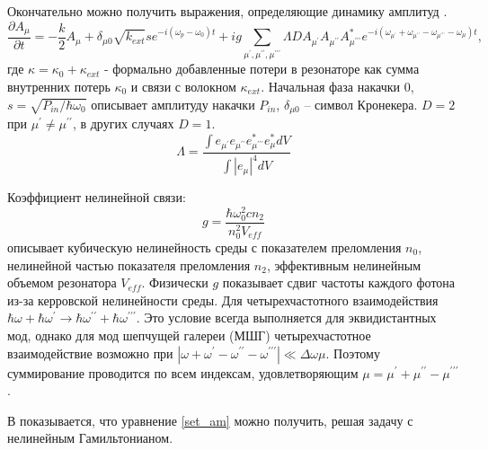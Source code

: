 Окончательно можно получить выражения, определяющие динамику амплитуд \cite{Herr2012}\cite{Chembo2010pra}.
\begin{equation}\label{set_am}
\frac{\partial A_\mu}{\partial t}=-\frac{k}{2}A_\mu+\delta_{\mu 0}\sqrt{k_{ext}}se^{-i(\omega_p-\omega_0)t}+ig\sum_{\mu^\prime,\mu^{\prime\prime},\mu^{\prime\prime\prime}} \Lambda D A_{\mu^\prime}A_{\mu^{\prime\prime}}A_{\mu^{\prime\prime\prime}}^*e^{-i(\omega_{\mu^\prime}+\omega_{\mu^{\prime\prime}}-\omega_{\mu^{\prime\prime\prime}}-\omega_\mu)t},
\end{equation}
где $\kappa=\kappa_0+\kappa_{ext}$ - формально добавленные потери в резонаторе как сумма внутренних потерь $\kappa_0$ и связи с волокном $\kappa_{ext}$. Начальная фаза накачки $0$, $s=\sqrt{P_{in}/\hbar\omega_0}$ описывает амплитуду накачки $P_{in}$, $\delta_{\mu0}$ -- символ Кронекера. $D=2$ при $\mu^\prime\neq\mu^{\prime\prime}$, в других случаях $D=1$.
\begin{equation}
\Lambda=\frac{\int e_{\mu^\prime}e_{\mu^{\prime\prime}}e_{\mu^{\prime\prime\prime}}^*e_\mu^*dV}{\int|e_\mu|^4dV}
\end{equation}

Коэффициент нелинейной связи:
\begin{equation}
g=\frac{\hbar\omega_0^2cn_2}{n_0^2V_{eff}}
\end{equation}
описывает кубическую нелинейность среды с показателем преломления $n_0$, нелинейной частью показателя преломления $n_2$, эффективным нелинейным объемом резонатора $V_{eff}$. Физически $g$ показывает сдвиг частоты каждого фотона из-за керровской нелинейности среды. Для четырехчастотного взаимодействия $\hbar\omega+\hbar\omega^\prime\rightarrow\hbar\omega^{\prime\prime}+\hbar\omega^{\prime\prime\prime}$. Это условие всегда выполняется для эквидистантных мод, однако для мод шепчущей галереи (МШГ) четырехчастотное взаимодействие возможно при $|\omega+\omega^\prime-\omega^{\prime\prime}-\omega^{\prime\prime\prime}|\ll\Delta\omega\mu$. Поэтому суммирование проводится по всем индексам, удовлетворяющим $\mu=\mu^\prime+\mu^{\prime\prime}-\mu^{\prime\prime\prime}$.

В \cite{Matsko2005} показывается, что уравнение \eqref{set_am} можно получить, решая задачу с нелинейным Гамильтонианом.


